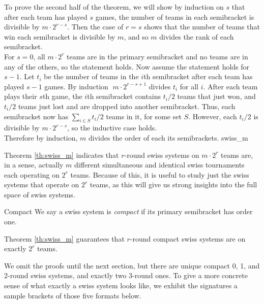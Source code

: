 {{        To prove the second half of the theorem, we will show by induction on $s$ that after each team has played $s$ games, the number of teams in each semibracket is divisible by $m \cdot 2^{r - s}.$ Then the case of $r = s$ shows that the number of teams that win each semibracket is divisible by $m$, and so $m$ divides the rank of each semibracket.\\

        For $s = 0$, all $m \cdot 2^r$ teams are in the primary semibracket and no teams are in any of the others, so the statement holds. Now assume the statement holds for $s - 1$. Let $t_i$ be the number of teams in the $i$th semibracket after each team has played $s -1$ games. By induction $\; m \cdot 2^{r - s + 1}$ divides $t_i$ for all $i$. After each team plays their $s$th game, the $i$th semibracket contains $t_i/2$ teams that just won, and $t_i/2$ teams just lost and are dropped into another semibracket. Thus, each semibracket now has $\sum_{i \in S} t_i / 2$ teams in it, for some set $S.$ However, each $t_i / 2$ is divisible by $m \cdot 2^{r - s}$, so the inductive case holds.\\
        
        Therefore by induction, $m$ divides the order of each its semibrackets.
    }{swiss_m}

    Theorem \ref{th:swiss_m} indicates that $r$-round swiss systems on $m \cdot 2^r$ teams are, in a sense, actually $m$ different simultaneous and identical swiss tournaments each operating on $2^r$ teams. Because of this, it is useful to study just the swiss systems that operate on $2^r$ teams, as this will give us strong insights into the full space of swiss systems.

    \begin{definition}{Compact}{}
        We say a swiss system is \textit{compact} if its primary semibracket has order one.
    \end{definition}

    Theorem \ref{th:swiss_m} guarantees that $r$-round compact swiss systems are on exactly $2^r$ teams.

    We omit the proofs until the next section, but there are unique compact 0, 1, and 2-round swiss systems, and exactly two 3-round ones. To give a more concrete sense of what exactly a swiss system looks like, we exhibit the signatures a sample brackets of those five formats below.

}
